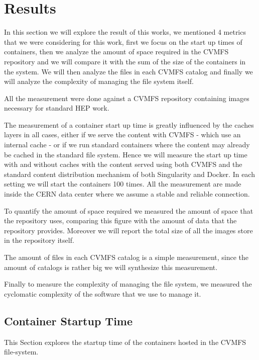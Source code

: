\chapter{Results}\label{ch:Results}

In this section we will explore the result of this works, we mentioned 4
metrics that we were considering for this work, first we focus on the start up
times of containers, then we analyze the amount of space required in the CVMFS
repository and we will compare it with the sum of the size of the containers in
the system. We will then analyze the files in each CVMFS catalog and finally we
will analyze the complexity of managing the file system itself.

All the measurement were done against a CVMFS repository containing
images necessary for standard HEP work.

The measurement of a container start up time is greatly influenced by the
caches layers in all cases, either if we serve the content with CVMFS - which
use an internal cache - or if we run standard containers where the content may
already be cached in the standard file system. Hence we will measure the start
up time with and without caches with the content served using both CVMFS and
the standard content distribution mechanism of both Singularity and Docker. In
each setting we will start the containers 100 times. All the measurement are
made inside the CERN data center where we assume a stable and reliable
connection.

To quantify the amount of space required we measured the amount of space that
the repository uses, comparing this figure with the amount of data that the
repository provides. Moreover we will report the total size of all the images
store in the repository itself.

The amount of files in each CVMFS catalog is a simple measurement, since the
amount of catalogs is rather big we will synthesize this measurement.

Finally to measure the complexity of managing the file system, we measured the
cyclomatic complexity of the software that we use to manage it.

\section{Container Startup Time}

This Section explores the startup time of the containers hosted in the CVMFS
file-system.

